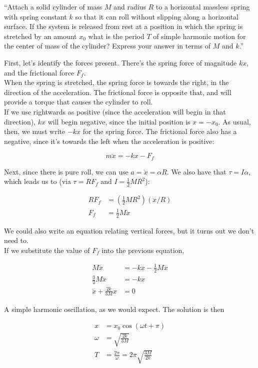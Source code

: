 \documentclass[8.01x]{subfiles}
\begin{document}
``Attach a solid cylinder of mass $M$ and radius $R$ to a horizontal massless spring with spring constant $k$ so that it can roll without slipping along a horizontal surface. If the system is released from rest at a position in which the spring is stretched by an amount $x_0$ what is the period $T$ of simple harmonic motion for the center of mass of the cylinder? Express your answer in terms of $M$ and $k$.''

First, let's identify the forces present. There's the spring force of magnitude $k x$, and the frictional force $F_f$.\\
When the spring is stretched, the spring force is towards the right, in the direction of the acceleration. The frictional force is opposite that, and will provide a torque that causes the cylinder to roll.\\
If we use rightwards as positive (since the acceleration will begin in that direction), $k x$ will begin negative, since the initial position is $x = -x_0$. As usual, then, we must write $- k x$ for the spring force. The frictional force also has a negative, since it's towards the left when the acceleration is positive:

\begin{equation}
m \ddot{x} = - k x - F_f
\end{equation}

Next, since there is pure roll, we can use $a = \ddot{x} = \alpha R$. We also have that $\tau = I \alpha$, which leads us to (via $\tau = R F_f$ and $\displaystyle I = \frac{1}{2} M R^2$):

\begin{align}
R F_f &= (\frac{1}{2} M R^2) (\ddot{x}/R)\\
F_f &= \frac{1}{2} M \ddot{x}
\end{align}

We could also write an equation relating vertical forces, but it turns out we don't need to.\\
If we substitute the value of $F_f$ into the previous equation,

\begin{align}
M \ddot{x} &= - k x - \frac{1}{2} M \ddot{x}\\
\frac{3}{2} M \ddot{x} &= - k x\\
\ddot{x} + \frac{2 k}{3 M} x &= 0
\end{align}

A simple harmonic oscillation, as we would expect. The solution is then

\begin{align}
x &= x_0 \cos(\omega t + \pi)\\
\omega &= \sqrt{\frac{2 k}{3 M}}\\
T &= \frac{2 \pi}{\omega} = 2 \pi \sqrt{\frac{3 M}{2 k}}
\end{align}
\end{document}
